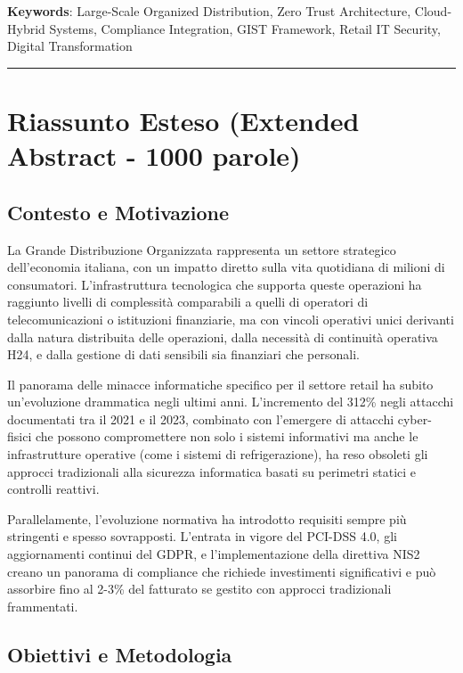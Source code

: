 \documentclass[12pt,a4paper,oneside]{book}
\numberwithin{figure}{chapter} %
\numberwithin{table}{chapter}  %
\begin{document}
\textbf{Keywords}: Large-Scale Organized Distribution, Zero Trust
Architecture, Cloud-Hybrid Systems, Compliance Integration, GIST
Framework, Retail IT Security, Digital Transformation

\begin{center}\rule{0.5\linewidth}{0.5pt}\end{center}

\section{Riassunto Esteso (Extended Abstract - 1000
parole)}\label{riassunto-esteso-extended-abstract---1000-parole}

\subsection{Contesto e Motivazione}\label{contesto-e-motivazione}

La Grande Distribuzione Organizzata rappresenta un settore strategico
dell'economia italiana, con un impatto diretto sulla vita quotidiana di
milioni di consumatori. L'infrastruttura tecnologica che supporta queste
operazioni ha raggiunto livelli di complessità comparabili a quelli di
operatori di telecomunicazioni o istituzioni finanziarie, ma con vincoli
operativi unici derivanti dalla natura distribuita delle operazioni,
dalla necessità di continuità operativa H24, e dalla gestione di dati
sensibili sia finanziari che personali.

Il panorama delle minacce informatiche specifico per il settore retail
ha subito un'evoluzione drammatica negli ultimi anni. L'incremento del
312\% negli attacchi documentati tra il 2021 e il 2023, combinato con
l'emergere di attacchi cyber-fisici che possono compromettere non solo i
sistemi informativi ma anche le infrastrutture operative (come i sistemi
di refrigerazione), ha reso obsoleti gli approcci tradizionali alla
sicurezza informatica basati su perimetri statici e controlli reattivi.

Parallelamente, l'evoluzione normativa ha introdotto requisiti sempre
più stringenti e spesso sovrapposti. L'entrata in vigore del PCI-DSS
4.0, gli aggiornamenti continui del GDPR, e l'implementazione della
direttiva NIS2 creano un panorama di compliance che richiede
investimenti significativi e può assorbire fino al 2-3\% del fatturato
se gestito con approcci tradizionali frammentati.

\subsection{Obiettivi e Metodologia}\label{obiettivi-e-metodologia}
\end{document}
